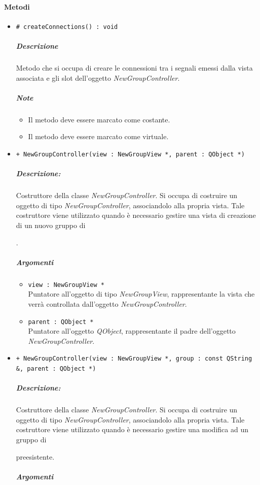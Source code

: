 	\paragraph{\color{black}Metodi}
		\begin{itemize}
			\item \color{blue} \verb!# createConnections() : void!
			\color{black}
			\subparagraph{Descrizione} Metodo che si occupa di creare le connessioni tra i segnali emessi dalla vista associata e gli slot\g{} dell'oggetto \textsl{NewGroupController}.
			\subparagraph{Note}
			\begin{itemize}
				\item Il metodo deve essere marcato come costante.
				\item Il metodo deve essere marcato come virtuale.
			\end{itemize}
			\item \color{blue} \verb!+ NewGroupController(view : NewGroupView *, parent : QObject *)!
			\color{black}
			\subparagraph{Descrizione:} Costruttore della classe \textsl{NewGroupController}. Si occupa di costruire un oggetto di tipo \textsl{NewGroupController}, associandolo alla propria vista. Tale costruttore viene utilizzato quando è necessario gestire una vista di creazione di un nuovo gruppo di \subject{}.
			\color{black}
			\subparagraph{Argomenti}
			\begin{itemize}
				\item \color{RoyalPurple} \verb!view : NewGroupView *!\\				
\color{black} Puntatore all'oggetto di tipo \textsl{NewGroupView}, rappresentante la vista che verrà controllata dall'oggetto \textsl{NewGroupController}.
				\item \color{RoyalPurple} \verb!parent : QObject *!\\				
\color{black} Puntatore all'oggetto \textsl{QObject}, rappresentante il padre dell'oggetto \textsl{NewGroupController}.
			\end{itemize}
			\item \color{blue} \verb!+ NewGroupController(view : NewGroupView *, group : const QString &, parent : QObject *)!
			\color{black}
			\subparagraph{Descrizione:} Costruttore della classe \textsl{NewGroupController}. Si occupa di costruire un oggetto di tipo \textsl{NewGroupController}, associandolo alla propria vista. Tale costruttore viene utilizzato quando è necessario gestire una modifica ad un gruppo di \subject{} preesistente.
			\color{black}
			\subparagraph{Argomenti}
			\begin{itemize}

\end{itemize}
\end{itemize}
